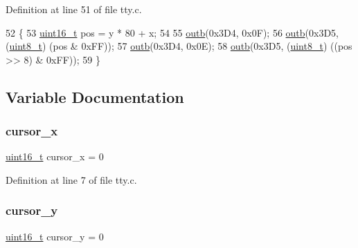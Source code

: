 Definition at line 51 of file tty.\+c.


\begin{DoxyCode}
52 \{
53     \hyperlink{a00125_a273cf69d639a59973b6019625df33e30_a273cf69d639a59973b6019625df33e30}{uint16\_t} pos = y * 80 + x;
54  
55     \hyperlink{a00140_aa37f5841c54156a4b14fc0d6f626b44f_aa37f5841c54156a4b14fc0d6f626b44f}{outb}(0x3D4, 0x0F);
56     \hyperlink{a00140_aa37f5841c54156a4b14fc0d6f626b44f_aa37f5841c54156a4b14fc0d6f626b44f}{outb}(0x3D5, (\hyperlink{a00125_aba7bc1797add20fe3efdf37ced1182c5_aba7bc1797add20fe3efdf37ced1182c5}{uint8\_t}) (pos & 0xFF));
57     \hyperlink{a00140_aa37f5841c54156a4b14fc0d6f626b44f_aa37f5841c54156a4b14fc0d6f626b44f}{outb}(0x3D4, 0x0E);
58     \hyperlink{a00140_aa37f5841c54156a4b14fc0d6f626b44f_aa37f5841c54156a4b14fc0d6f626b44f}{outb}(0x3D5, (\hyperlink{a00125_aba7bc1797add20fe3efdf37ced1182c5_aba7bc1797add20fe3efdf37ced1182c5}{uint8\_t}) ((pos >> 8) & 0xFF));
59 \}
\end{DoxyCode}


\subsection{Variable Documentation}
\mbox{\label{a00149_ae69604af0f9bd5fca2a016d0aa1ba7e1_ae69604af0f9bd5fca2a016d0aa1ba7e1}} 
\subsubsection{\texorpdfstring{cursor\+\_\+x}{cursor\_x}}
{\footnotesize\ttfamily \hyperlink{a00125_a273cf69d639a59973b6019625df33e30_a273cf69d639a59973b6019625df33e30}{uint16\+\_\+t} cursor\+\_\+x = 0}



Definition at line 7 of file tty.\+c.

\mbox{\label{a00149_a0301c5492919c401c2c1ecf52af709b0_a0301c5492919c401c2c1ecf52af709b0}} 
\subsubsection{\texorpdfstring{cursor\+\_\+y}{cursor\_y}}
{\footnotesize\ttfamily \hyperlink{a00125_a273cf69d639a59973b6019625df33e30_a273cf69d639a59973b6019625df33e30}{uint16\+\_\+t} cursor\+\_\+y = 0}



